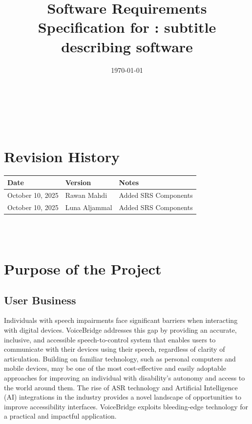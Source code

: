 \documentclass[12pt]{article}
\begin{document}
\title{Software Requirements Specification for \progname: subtitle describing software} 
\author{\authname}
\date{\today}
	
\maketitle

~\newpage


\tableofcontents

~\newpage

\section*{Revision History}

\begin{tabularx}{\textwidth}{p{3cm}p{2cm}X}
\toprule {\textbf{Date}} & {\textbf{Version}} & {\textbf{Notes}}\\
\midrule

October 10, 2025 & Rawan Mahdi & Added SRS Components\\
October 10, 2025 & Luna Aljammal & Added SRS Components\\

\bottomrule
\end{tabularx}

~\\

~\newpage
\section{Purpose of the Project}
\subsection{User Business}


Individuals with speech impairments face significant barriers when interacting with digital devices. VoiceBridge addresses this gap by providing an accurate, inclusive, and accessible speech-to-control system that enables users to communicate with their devices using their speech, regardless of clarity of articulation. Building on familiar technology, such as personal computers and mobile devices, may be one of the most cost-effective and easily adoptable approaches for improving an individual with disability’s autonomy and access to the world around them. The rise of ASR technology and Artificial Intelligence (AI) integrations in the industry provides a novel landscape of opportunities to improve accessibility interfaces. VoiceBridge exploits bleeding-edge technology for a practical and impactful application.
\end{document}
